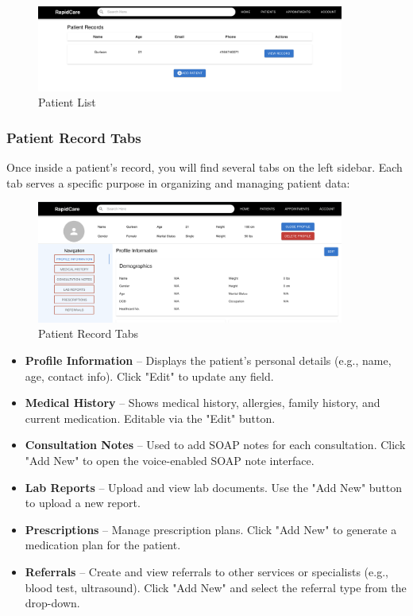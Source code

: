\documentclass[12pt, titlepage]{article}
\begin{document}
\begin{figure}[H]
\centering
\includegraphics[width=0.9\textwidth]{patient_list.png}
\caption{Patient List}
\label{fig:Patient List}
\end{figure}

\subsubsection{Patient Record Tabs}
Once inside a patient's record, you will find several tabs on the left sidebar. Each tab serves a specific purpose in organizing and managing patient data:

\begin{figure}[H]
\centering
\includegraphics[width=0.9\textwidth]{patient.png}
\caption{Patient Record Tabs}
\label{fig:Patient Record Tabs}
\end{figure}
    
\begin{itemize}
    \item \textbf{Profile Information} – Displays the patient’s personal details (e.g., name, age, contact info). Click "Edit" to update any field.
    \item \textbf{Medical History} – Shows medical history, allergies, family history, and current medication. Editable via the "Edit" button.
    \item \textbf{Consultation Notes} – Used to add SOAP notes for each consultation. Click "Add New" to open the voice-enabled SOAP note interface.
    \item \textbf{Lab Reports} – Upload and view  lab documents. Use the "Add New" button to upload a new report.
    \item \textbf{Prescriptions} – Manage prescription plans. Click "Add New" to generate a medication plan for the patient.
    \item \textbf{Referrals} – Create and view referrals to other services or specialists (e.g., blood test, ultrasound). Click "Add New" and select the referral type from the drop-down.
\end{itemize}
\end{document}
